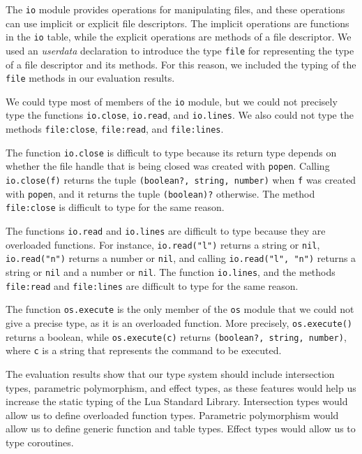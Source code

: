 The \texttt{io} module provides operations for manipulating files,
and these operations can use implicit or explicit file descriptors.
The implicit operations are functions in the \texttt{io} table,
while the explicit operations are methods of a file descriptor.
We used an \emph{userdata} declaration to introduce the type
\texttt{file} for representing the type of a file descriptor
and its methods.
For this reason, we included the typing of the \texttt{file}
methods in our evaluation results.

We could type most of members of the \texttt{io} module,
but we could not precisely type the functions \texttt{io.close},
\texttt{io.read}, and \texttt{io.lines}.
We also could not type the methods \texttt{file:close},
\texttt{file:read}, and \texttt{file:lines}.

The function \texttt{io.close} is difficult to type
because its return type depends on whether the file handle that is
being closed was created with \texttt{popen}.
Calling \texttt{io.close(f)} returns the tuple \texttt{(boolean?, string, number)}
when \texttt{f} was created with \texttt{popen},
and it returns the tuple \texttt{(boolean)?} otherwise.
The method \texttt{file:close} is difficult to type for the same reason.

The functions \texttt{io.read} and \texttt{io.lines} are difficult
to type because they are overloaded functions.
For instance, \texttt{io.read("l")} returns a string or \texttt{nil},
\texttt{io.read("n")} returns a number or \texttt{nil}, and calling
\texttt{io.read("l", "n")} returns a string or \texttt{nil} and a number or \texttt{nil}.
The function \texttt{io.lines}, and the methods \texttt{file:read} and
\texttt{file:lines} are difficult to type for the same reason.

The function \texttt{os.execute} is the only member of the \texttt{os}
module that we could not give a precise type, as it is an overloaded
function.
More precisely, \texttt{os.execute()} returns a boolean, while
\texttt{os.execute(c)} returns \texttt{(boolean?, string, number)},
where \texttt{c} is a string that represents the command to be executed.

The evaluation results show that our type system should include
intersection types, parametric polymorphism, and effect types,
as these features would help us increase the static typing of the
Lua Standard Library.
Intersection types would allow us to define overloaded function types.
Parametric polymorphism would allow us to define generic function and table types.
Effect types would allow us to type coroutines.

